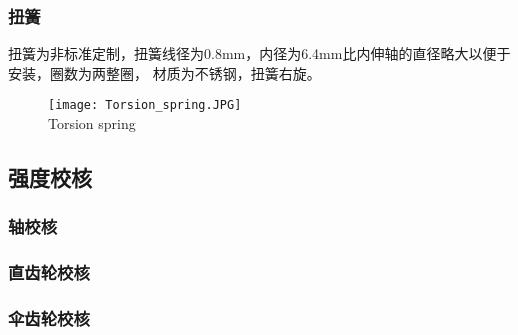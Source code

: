 \subsubsection{扭簧}

扭簧为非标准定制，扭簧线径为0.8mm，内径为6.4mm比内伸轴的直径略大以便于安装，圈数为两整圈，
材质为不锈钢，扭簧右旋。

\begin{figure}[!htp]
  \centering
  \texttt{[image: Torsion\_spring.JPG]} \\
    {Torsion spring}
  \label{fig:扭簧}
\end{figure}

\subsection{强度校核}


\subsubsection{轴校核}
\subsubsection{直齿轮校核}
\subsubsection{伞齿轮校核}